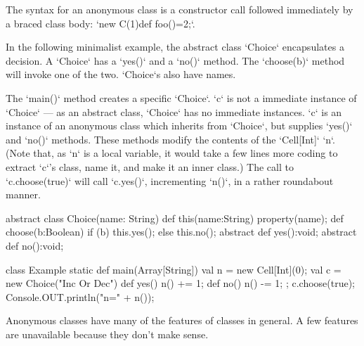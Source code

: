 The syntax for an anonymous class is a constructor call followed immediately
by a braced class body: \xcd`new C(1){def foo()=2;}`.

\begin{ex}In the following minimalist example, the abstract class \xcd`Choice`
encapsulates a decision.   A \xcd`Choice` has a \xcd`yes()` and a \xcd`no()`
method.  The \xcd`choose(b)` method will invoke one of the two.  \xcd`Choice`s
also have names.

The \xcd`main()` method creates a specific \xcd`Choice`.  \xcd`c` is not a
immediate instance of \xcd`Choice` --- as an abstract class, \xcd`Choice` has
no immediate instances. \xcd`c` is an instance of an anonymous class which
inherits from \xcd`Choice`, but supplies \xcd`yes()` and \xcd`no()` methods.
These methods modify the contents of the \xcd`Cell[Int]` \xcd`n`.  (Note that,
as \xcd`n` is a local variable, it would take a few lines more coding to
extract \xcd`c`'s class, name it, and make it an inner class.)  The call to
\xcd`c.choose(true)`  will call \xcd`c.yes()`, incrementing \xcd`n()`, in a
rather roundabout manner.

\begin{xten}
abstract class Choice(name: String) {
  def this(name:String) {property(name);}
  def choose(b:Boolean) { 
     if (b) this.yes(); else this.no(); }
  abstract def yes():void;
  abstract def no():void;
}

class Example {
  static def main(Array[String]) {
    val n = new Cell[Int](0);
    val c = new Choice("Inc Or Dec") {
      def yes() { n() += 1; }
      def no()  { n() -= 1; }
      };
    c.choose(true);
    Console.OUT.println("n=" + n());
  }
}

\end{xten}
%
\end{ex}

Anonymous classes have many of the features of classes in general.  A few
features are unavailable because they don't make sense.

